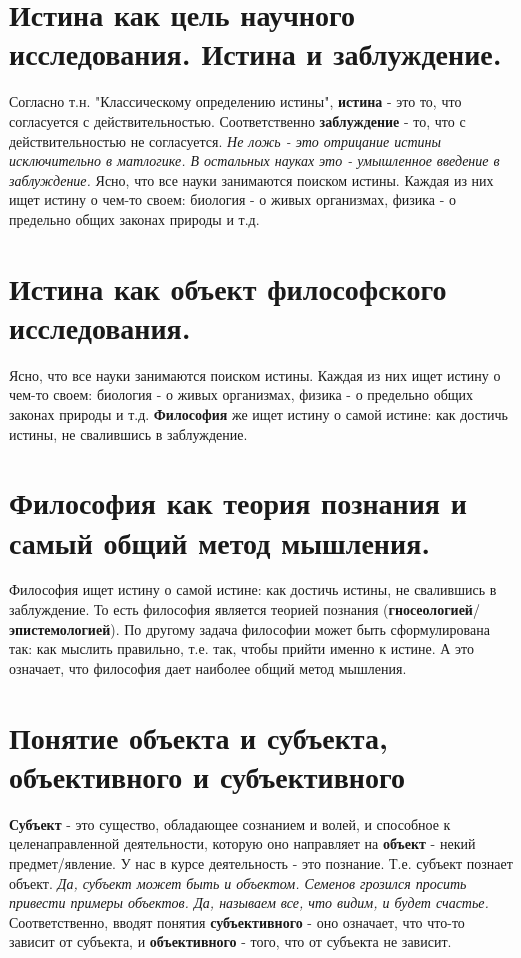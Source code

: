 \documentclass[12pt,a4paper]{article}
\begin{document}
\section{Истина как цель научного исследования. Истина и заблуждение.}
Согласно т.н. "Классическому определению истины", \textbf{истина} - это то, что согласуется с действительностью. 
Соответственно \textbf{заблуждение} - то, что с действительностью не согласуется. \textit{Не ложь - это отрицание истины исключительно в матлогике. В остальных науках это - умышленное введение в заблуждение.}
Ясно, что все науки занимаются поиском истины.
Каждая из них ищет истину о чем-то своем: биология - о живых организмах, физика - о предельно общих законах природы и т.д.

\section{Истина как объект философского исследования.}
Ясно, что все науки занимаются поиском истины.
Каждая из них ищет истину о чем-то своем: биология - о живых организмах, физика - о предельно общих законах природы и т.д.
\textbf{Философия} же ищет истину о самой истине: как достичь истины, не свалившись в заблуждение.

\section{Философия как теория познания и самый общий метод мышления.}
Философия ищет истину о самой истине: как достичь истины, не свалившись в заблуждение.
То есть философия является теорией познания (\textbf{гносеологией}/\textbf{эпистемологией}).
По другому задача философии может быть сформулирована так: как мыслить правильно, т.е. так, чтобы прийти именно к истине.
А это означает, что философия дает наиболее общий метод мышления. 

\section{Понятие объекта и субъекта, объективного и субъективного}
\textbf{Субъект} - это существо, обладающее сознанием и волей, и способное к целенаправленной деятельности,
которую оно направляет на \textbf{объект} - некий предмет/явление.
У нас в курсе деятельность - это познание.
Т.е. субъект познает объект.
\textit{Да, субъект может быть и объектом. Семенов грозился просить привести примеры объектов.
Да, называем все, что видим, и будет счастье.} 
Соответственно, вводят понятия \textbf{субъективного} - оно означает, что что-то зависит от субъекта,
и \textbf{объективного} - того, что от субъекта не зависит.
\end{document}
